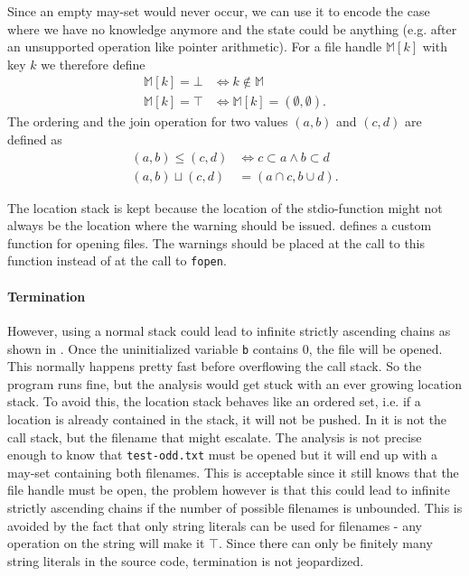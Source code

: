 Since an empty may-set would never occur, we can use it to encode the case where we have no knowledge anymore and the state could be anything (e.g. after an unsupported operation like pointer arithmetic).
For a file handle $\mathbb{M}[k]$ with key $k$ we therefore define 
\begin{align}
\mathbb{M}[k] = \bot &\Leftrightarrow k \notin \mathbb{M}\\
\mathbb{M}[k] = \top &\Leftrightarrow \mathbb{M}[k] = (\emptyset, \emptyset).
\end{align}
The ordering and the join operation for two values $(a,b)$ and $(c,d)$ are defined as
\begin{align}
(a,b) \leq (c,d) &\Leftrightarrow c \subset a \wedge b \subset d\\
(a,b) \sqcup (c,d) &= (a \cap c, b \cup d).
\end{align}

The location stack is kept because the location of the stdio-function might not always be the location where the warning should be issued.  defines a custom function for opening files. The warnings should be placed at the call to this function instead of at the call to \verb|fopen|.

\paragraph*{Termination}
However, using a normal stack could lead to infinite strictly ascending chains as shown in . Once the uninitialized variable \verb|b| contains 0, the file will be opened. This normally happens pretty fast before overflowing the call stack. So the program runs fine, but the analysis would get stuck with an ever growing location stack. To avoid this, the location stack behaves like an ordered set, i.e. if a location is already contained in the stack, it will not be pushed. %
In  it is not the call stack, but the filename that might escalate. The analysis is not precise enough to know that \verb|test-odd.txt| must be opened but it will end up with a may-set containing both filenames. This is acceptable since it still knows that the file handle must be open, the problem however is that this could lead to infinite strictly ascending chains if the number of possible filenames is unbounded. This is avoided by the fact that only string literals can be used for filenames - any operation on the string will make it $\top$. Since there can only be finitely many string literals in the source code, termination is not jeopardized.

